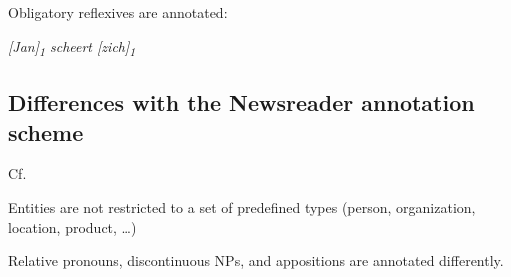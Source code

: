 \begin{itemize*}
\begin{itemize*}
    \end{itemize*}
    
\item Obligatory reflexives are annotated:

    \emph{{[}Jan{]}\textsubscript{1} scheert
  {[}zich{]}\textsubscript{1}}
  
\end{itemize*}


\subsection{Differences with the Newsreader annotation scheme}
Cf. \citet{schoen2014newsreader}
\begin{itemize*}
\item Entities are not restricted to a set of predefined types
    (person, organization, location, product, \dots)
\item Relative pronouns, discontinuous NPs, and appositions are annotated
  differently.
\end{itemize*}



